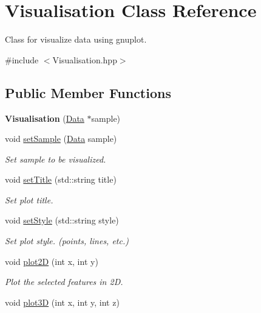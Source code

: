 \hypertarget{class_visualisation}{}\section{Visualisation Class Reference}
\label{class_visualisation}


Class for visualize data using gnuplot.  




{\ttfamily \#include $<$Visualisation.\+hpp$>$}

\subsection*{Public Member Functions}
\begin{DoxyCompactItemize}
\item 
\mbox{\label{class_visualisation_a7633f9b6b5350f8d6b6dd3e0aada0927}} 
{\bfseries Visualisation} (\hyperlink{class_data}{Data} $\ast$sample)
\item 
void \hyperlink{class_visualisation_a124977561c36f63108795e849ad0f100}{set\+Sample} (\hyperlink{class_data}{Data} sample)
\begin{DoxyCompactList}\small\item\em Set sample to be visualized. \end{DoxyCompactList}\item 
void \hyperlink{class_visualisation_ac217fcae4984edeb003bfcd208a253de}{set\+Title} (std\+::string title)
\begin{DoxyCompactList}\small\item\em Set plot title. \end{DoxyCompactList}\item 
void \hyperlink{class_visualisation_a2d29fee9180bcb2fd5cb6fc78253ac5b}{set\+Style} (std\+::string style)
\begin{DoxyCompactList}\small\item\em Set plot style. (points, lines, etc.) \end{DoxyCompactList}\item 
void \hyperlink{class_visualisation_a7569c77520391e6adf7e285410f4b358}{plot2D} (int x, int y)
\begin{DoxyCompactList}\small\item\em Plot the selected features in 2D. \end{DoxyCompactList}\item 
void \hyperlink{class_visualisation_a39cf83c146a4c92a32782bfdf6168594}{plot3D} (int x, int y, int z)

\end{DoxyCompactItemize}
